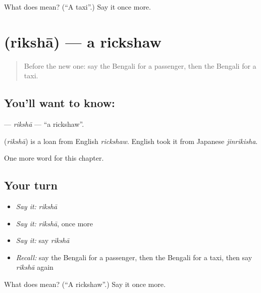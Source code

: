 \begin{tcolorbox}[breakable,colback=teal!4,colframe=teal!35!black,title={Before you move on}]
What does  mean? (\textquotedblleft{}A taxi\textquotedblright{}.) Say it once more.
\end{tcolorbox}
\section[\texorpdfstring{\bn{রিকশা} (rikshā)}{রিকশা (rikshā)}]{ (rikshā) — a rickshaw}

\label{lesson:BN-C167-riksha}



\begin{quote}
Before the new one: say the Bengali for a passenger, then the Bengali for a taxi.
\end{quote}

\subsection*{You'll want to know: }
\textbf{} — \emph{rikshā} — \textquotedblleft{}a rickshaw\textquotedblright{}.

\begin{cousinweb}
\textbf{} (\emph{rikshā}) is a loan from English \emph{rickshaw}. English took it from Japanese \emph{jinrikisha}.
\end{cousinweb}

\begin{grammarlens}[title={What you've built}]
One more word for this chapter.
\end{grammarlens}

\subsection*{Your turn}
\begin{itemize}
\raggedright
  \item \emph{Say it:} \emph{rikshā}
  \item \emph{Say it:} \emph{rikshā}, once more
  \item \emph{Say it:} say \emph{rikshā}
  \item \emph{Recall:} say the Bengali for a passenger, then the Bengali for a taxi, then say \emph{rikshā} again
\end{itemize}

\begin{tcolorbox}[breakable,colback=teal!4,colframe=teal!35!black,title={Before you move on}]
What does  mean? (\textquotedblleft{}A rickshaw\textquotedblright{}.) Say it once more.
\end{tcolorbox}
